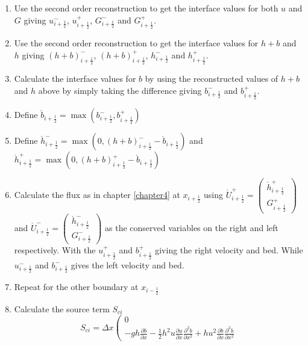 \documentclass[12pt]{article}
\begin{document}
\label{MethodWellBalancedAudusse}
\begin{enumerate}
  \item Use the second order reconstruction to get the interface values for both $u$ and $G$ giving $u^{-}_{i + \frac{1}{2}}$, $u^{+}_{i + \frac{1}{2}}$, $G^{-}_{i + \frac{1}{2}}$ and $G^{+}_{i + \frac{1}{2}}$.
  \item Use the second order reconstruction to get the interface values for $h+b$ and $h$ giving $(h+b)^{-}_{i + \frac{1}{2}}$, $(h+b)^{+}_{i + \frac{1}{2}}$, $h^{-}_{i + \frac{1}{2}}$ and $h^{+}_{i + \frac{1}{2}}$.
  \item Calculate the interface values for $b$ by using the reconstructed values of $h+b$ and $h$ above by simply taking the difference giving $b^{-}_{i + \frac{1}{2}}$ and $b^{+}_{i + \frac{1}{2}}$.
  \item Define $\acute{b}_{i + \frac{1}{2}} = \max\left(b^{-}_{i + \frac{1}{2}} , b^{+}_{i + \frac{1}{2}}\right)$
  \item Define $\acute{h}^{-}_{i + \frac{1}{2}} = \max\left(0 ,(h+b)^{-}_{i + \frac{1}{2}} - \acute{b}_{i + \frac{1}{2}} \right)$ and $\acute{h}^{+}_{i + \frac{1}{2}} = \max\left(0 ,(h+b)^{+}_{i + \frac{1}{2}} - \acute{b}_{i + \frac{1}{2}} \right)$
  \item Calculate the flux as in chapter \ref{chapter4} at $x_{i + \frac{1}{2}}$ using $\acute{U}^{+}_{i + \frac{1}{2}} = \left(\begin{array}{c}
    \acute{h}^{+}_{i + \frac{1}{2}} \\
    G^+_{i + \frac{1}{2}}
    \end{array}\right)$ and $\acute{U}^{-}_{i + \frac{1}{2}} = \left(\begin{array}{c}
      \acute{h}^{-}_{i + \frac{1}{2}} \\
      G^-_{i + \frac{1}{2}}
      \end{array}\right)$ as the conserved variables on the right and left respectively. With the $u^{+}_{i + \frac{1}{2}}$ and $b^{+}_{i + \frac{1}{2}}$ giving the right velocity and bed. While $u^{-}_{i + \frac{1}{2}}$ and $b^{-}_{i + \frac{1}{2}}$ gives the left velocity and bed.
  \item Repeat for the other boundary at $x_{i - \frac{1}{2}}$ 
  \item Calculate the source term $S_{ci}$ 
    \[S_{ci} = \Delta x \left(\begin{array}{c}
    0 \\
    -g h \frac{\partial b}{\partial x} - \frac{1}{2} h^2 {u} \frac{\partial {u}}{\partial x} \frac{\partial^2 b}{\partial x^2} + h {u}^2 \frac{\partial b}{\partial x} \frac{\partial^2 b}{\partial x^2}

\end{array}\]
\end{enumerate}
\end{document}
